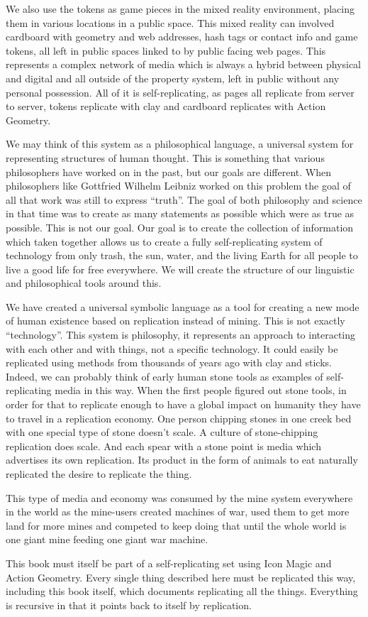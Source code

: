 We also use the tokens as game pieces in the mixed reality environment,
placing them in various locations in a public space. This mixed reality
can involved cardboard with geometry and web addresses, hash tags or
contact info and game tokens, all left in public spaces linked to by
public facing web pages. This represents a complex network of media
which is always a hybrid between physical and digital and all outside of
the property system, left in public without any personal possession. All
of it is self-replicating, as pages all replicate from server to server,
tokens replicate with clay and cardboard replicates with Action
Geometry.

We may think of this system as a philosophical language, a universal
system for representing structures of human thought. This is something
that various philosophers have worked on in the past, but our goals are
different. When philosophers like Gottfried Wilhelm Leibniz worked on
this problem the goal of all that work was still to express ``truth''.
The goal of both philosophy and science in that time was to create as
many statements as possible which were as true as possible. This is not
our goal. Our goal is to create the collection of information which
taken together allows us to create a fully self-replicating system of
technology from only trash, the sun, water, and the living Earth for all
people to live a good life for free everywhere. We will create the
structure of our linguistic and philosophical tools around this.

We have created a universal symbolic language as a tool for creating a
new mode of human existence based on replication instead of mining. This
is not exactly ``technology''. This system is philosophy, it represents
an approach to interacting with each other and with things, not a
specific technology. It could easily be replicated using methods from
thousands of years ago with clay and sticks. Indeed, we can probably
think of early human stone tools as examples of self-replicating media
in this way. When the first people figured out stone tools, in order for
that to replicate enough to have a global impact on humanity they have
to travel in a replication economy. One person chipping stones in one
creek bed with one special type of stone doesn't scale. A culture of
stone-chipping replication does scale. And each spear with a stone point
is media which advertises its own replication. Its product in the form
of animals to eat naturally replicated the desire to replicate the
thing.

This type of media and economy was consumed by the mine system
everywhere in the world as the mine-users created machines of war, used
them to get more land for more mines and competed to keep doing that
until the whole world is one giant mine feeding one giant war machine.

This book must itself be part of a self-replicating set using Icon Magic
and Action Geometry. Every single thing described here must be
replicated this way, including this book itself, which documents
replicating all the things. Everything is recursive in that it points
back to itself by replication.
